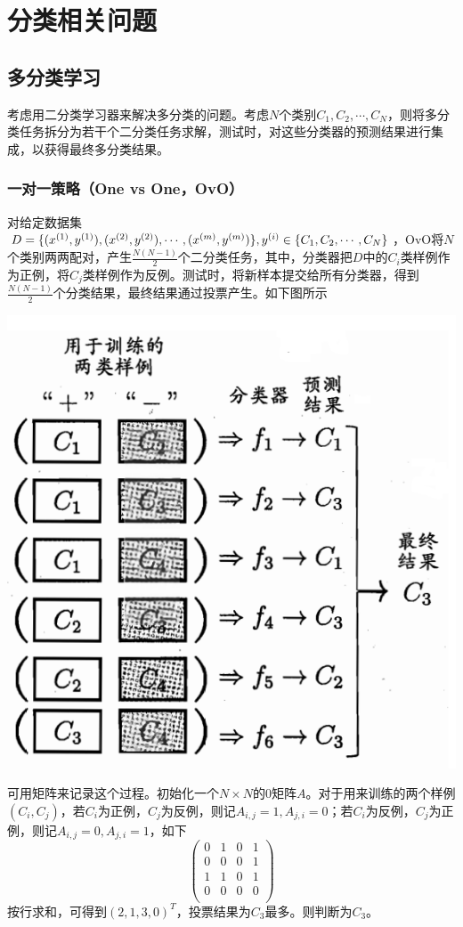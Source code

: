 \section{分类相关问题}
\subsection{多分类学习}
考虑用二分类学习器来解决多分类的问题。考虑$N$个类别$C_1,C_2,\cdots,C_N$，则将多分类任务拆分为若干个二分类任务求解，测试时，对这些分类器的预测结果进行集成，以获得最终多分类结果。
\subsubsection{一对一策略（One vs One，OvO）}
对给定数据集$D=\{({x}^{({1})},{y}^{({1})}),({x}^{({2})},{y}^{({2})}),\cdots,({x}^{({m})},{y}^{({m})})\},{y}^{({i})}\in\{ C_1,C_2,\cdots,C_N \}$，OvO将$N$个类别两两配对，产生$\frac{N(N-1)}{2}$个二分类任务，其中，分类器把$D$中的$C_i$类样例作为正例，将$C_j$类样例作为反例。测试时，将新样本提交给所有分类器，得到$\frac{N(N-1)}{2}$个分类结果，最终结果通过投票产生。如下图所示
\begin{center}
\includegraphics[scale=0.5]{../figures/CP1.PNG} 
\end{center}
可用矩阵来记录这个过程。初始化一个$N\times N$的0矩阵$A$。对于用来训练的两个样例$(C_i,C_j)$，若$C_i$为正例，$C_j$为反例，则记$A_{i,j}=1,A_{j,i}=0$；若$C_i$为反例，$C_j$为正例，则记$A_{i,j}=0,A_{j,i}=1$，如下
\begin{equation}
\begin{pmatrix}
0 & 1 & 0 & 1\\
0 & 0 & 0 & 1\\
1 & 1 & 0 & 1\\
0 & 0 & 0 & 0\\
\end{pmatrix}
\end{equation}
按行求和，可得到$(2,1,3,0)^T$，投票结果为$C_3$最多。则判断为$C_3$。
